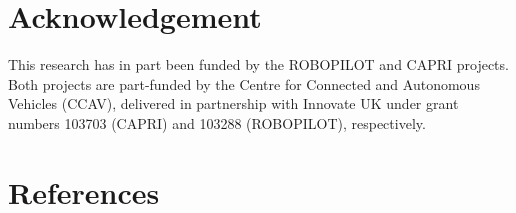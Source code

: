 \documentclass[letterpaper, 10 pt, journal, twoside]{IEEEtran}
\begin{document}





\section*{Acknowledgement}
This research has in part been funded by the ROBOPILOT and CAPRI projects. Both
projects are part-funded by the Centre for Connected and Autonomous
Vehicles (CCAV), delivered in partnership with Innovate UK under grant numbers
103703 (CAPRI) and 103288 (ROBOPILOT), respectively.


\balance
\section*{References}
\printbibliography[heading=none]
\end{document}
